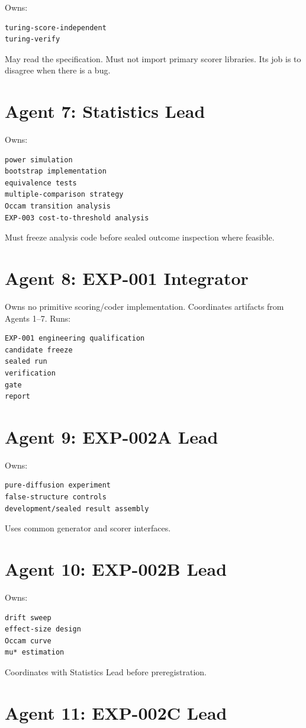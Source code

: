 \documentclass[11pt]{article}
\begin{document}
Owns:
\begin{verbatim}
turing-score-independent
turing-verify
\end{verbatim}
May read the specification. Must not import primary scorer libraries. Its job is to disagree when there is a bug.

\section{Agent 7: Statistics Lead}

Owns:
\begin{verbatim}
power simulation
bootstrap implementation
equivalence tests
multiple-comparison strategy
Occam transition analysis
EXP-003 cost-to-threshold analysis
\end{verbatim}
Must freeze analysis code before sealed outcome inspection where feasible.

\section{Agent 8: EXP-001 Integrator}

Owns no primitive scoring/coder implementation. Coordinates artifacts from Agents 1--7. Runs:
\begin{verbatim}
EXP-001 engineering qualification
candidate freeze
sealed run
verification
gate
report
\end{verbatim}

\section{Agent 9: EXP-002A Lead}

Owns:
\begin{verbatim}
pure-diffusion experiment
false-structure controls
development/sealed result assembly
\end{verbatim}
Uses common generator and scorer interfaces.

\section{Agent 10: EXP-002B Lead}

Owns:
\begin{verbatim}
drift sweep
effect-size design
Occam curve
mu* estimation
\end{verbatim}
Coordinates with Statistics Lead before preregistration.

\section{Agent 11: EXP-002C Lead}
\end{document}
